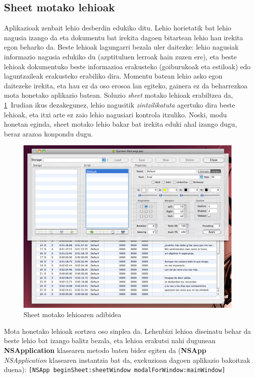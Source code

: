 \subsection{Sheet motako lehioak}
Aplikazioak zenbait lehio desberdin edukiko ditu. Lehio horietatik bat lehio nagusia izango da eta dokumentu bat irekita dagoen bitartean lehio hau irekita egon beharko da. Beste lehioak lagungarri bezala uler daitezke: lehio nagusiak informazio nagusia edukiko du (azptituluen lerroak hain zuzen ere), eta beste lehioak dokumentuko beste informazioa erakusteko (goiburukoak eta estiloak) edo laguntzaileak erakusteko erabiliko dira. Momentu batean lehio asko egon daitezeke irekita, eta hau ez da oso erosoa lan egiteko, gainera ez da beharrezkoa mota honetako aplikazio batean. Soluzio \textit{sheet} motako lehioak erabiltzea da, \ref{sheet}~Irudian ikus dezakegunez, lehio nagusitik \textit{zintzilikatuta} agertuko dira beste lehioak, eta itxi arte ez zaio lehio nagusiari kontrola itzuliko. Noski, modu honetan eginda, sheet motako lehio bakar bat irekita eduki ahal izango dugu, beraz arazoa konpondu dugu.
\begin{figure}[htp]
\begin{center}
\includegraphics[scale=0.4]{Pictures/Chapter4/Diseinua/Sheet.png}
\caption{Sheet motako lehioaren adibidea}
\label{sheet}
\end{center}
\end{figure}
Mota honetako lehioak sortzea oso sinplea da. Lehenbizi lehioa diseinatu behar da beste lehio bat izango balitz bezala, eta lehioa erakutsi nahi dugunean \textbf{NSApplication} klasearen metodo baten bidez egiten da (\textbf{NSApp} \textit{NSApplication} klasearen instantzia bat da, exekuzioan dagoen aplikazio bakoitzak duena):
\texttt{[NSApp beginSheet:sheetWindow modalForWindow:mainWindow]}

